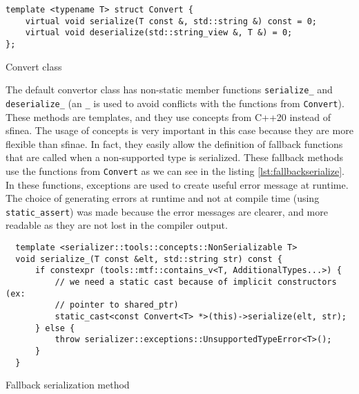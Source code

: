 \begin{listing}[ht!]
\begin{verbatim}
template <typename T> struct Convert {
    virtual void serialize(T const &, std::string &) const = 0;
    virtual void deserialize(std::string_view &, T &) = 0;
};
\end{verbatim}
\caption{Convert class}
\label{lst:convert}
\end{listing}

The default convertor class has non-static member functions
\texttt{serialize\_} and \texttt{deserialize\_} (an \texttt{\_} is used to avoid
conflicts with the functions from \texttt{Convert}). These methods are
templates, and they use concepts from C++20 instead of \gls{sfinea}. The usage of
concepts is very important in this case because they are more flexible than
\gls{sfinae}. In fact, they easily allow the definition of fallback functions
that are called when a non-supported type is serialized. These fallback
methods use the functions from \texttt{Convert} as we can see in the listing
\ref{lst:fallbackserialize}. In these functions, exceptions are used to create
useful error message at runtime. The choice of generating errors at runtime and
not at compile time (using \texttt{static\_assert}) was made because the error
messages are clearer, and more readable as they are not lost in the compiler
output.

\begin{listing}[ht!]
\begin{verbatim}
  template <serializer::tools::concepts::NonSerializable T>
  void serialize_(T const &elt, std::string str) const {
      if constexpr (tools::mtf::contains_v<T, AdditionalTypes...>) {
          // we need a static cast because of implicit constructors (ex:
          // pointer to shared_ptr)
          static_cast<const Convert<T> *>(this)->serialize(elt, str);
      } else {
          throw serializer::exceptions::UnsupportedTypeError<T>();
      }
  }
\end{verbatim}
\caption{Fallback serialization method}
\label{lstd:fallbackserialize}
\end{listing}

